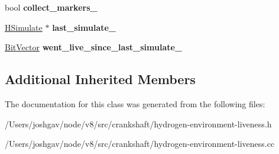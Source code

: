 \begin{DoxyCompactItemize}
\item 
bool {\bfseries collect\+\_\+markers\+\_\+}\hypertarget{classv8_1_1internal_1_1_h_environment_liveness_analysis_phase_a8a6f4c375cbe475d22e06b1e2fe76b1c}{}\label{classv8_1_1internal_1_1_h_environment_liveness_analysis_phase_a8a6f4c375cbe475d22e06b1e2fe76b1c}

\item 
\hyperlink{classv8_1_1internal_1_1_h_simulate}{H\+Simulate} $\ast$ {\bfseries last\+\_\+simulate\+\_\+}\hypertarget{classv8_1_1internal_1_1_h_environment_liveness_analysis_phase_a9cc80dd043e570f7efd175dd210e7ff0}{}\label{classv8_1_1internal_1_1_h_environment_liveness_analysis_phase_a9cc80dd043e570f7efd175dd210e7ff0}

\item 
\hyperlink{classv8_1_1internal_1_1_bit_vector}{Bit\+Vector} {\bfseries went\+\_\+live\+\_\+since\+\_\+last\+\_\+simulate\+\_\+}\hypertarget{classv8_1_1internal_1_1_h_environment_liveness_analysis_phase_a0aa9b3c1bf2335b89d27d29c23d08706}{}\label{classv8_1_1internal_1_1_h_environment_liveness_analysis_phase_a0aa9b3c1bf2335b89d27d29c23d08706}

\end{DoxyCompactItemize}
\subsection*{Additional Inherited Members}


The documentation for this class was generated from the following files\+:\begin{DoxyCompactItemize}
\item 
/\+Users/joshgav/node/v8/src/crankshaft/hydrogen-\/environment-\/liveness.\+h\item 
/\+Users/joshgav/node/v8/src/crankshaft/hydrogen-\/environment-\/liveness.\+cc\end{DoxyCompactItemize}
